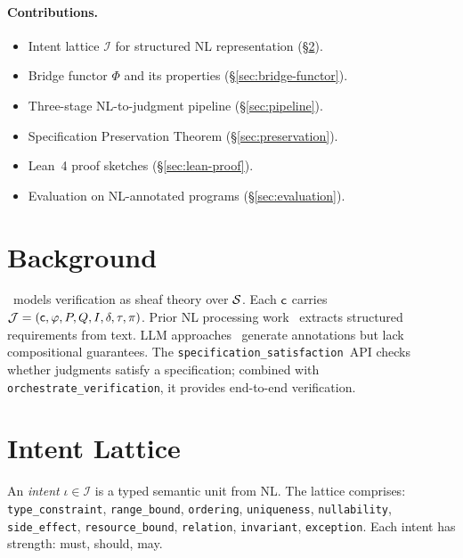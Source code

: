 \documentclass[11pt]{article}
\newcommand{\OrchestrateVerif}{\texttt{orchestrate\_verification}}
\newcommand{\SpecSatisfaction}{\texttt{specification\_satisfaction}}
\newcommand{\IntentLattice}{\mathcal{I}}
\newcommand{\SpecFunctor}{\Phi}
\begin{document}
\paragraph{Contributions.}
\begin{itemize}[noitemsep]
  \item Intent lattice $\IntentLattice$ for structured NL
        representation (§\ref{sec:intent-lattice}).
  \item Bridge functor $\SpecFunctor$ and its properties
        (§\ref{sec:bridge-functor}).
  \item Three-stage NL-to-judgment pipeline (§\ref{sec:pipeline}).
  \item Specification Preservation Theorem (§\ref{sec:preservation}).
  \item Lean~4 proof sketches (§\ref{sec:lean-proof}).
  \item Evaluation on \ppLXXprogramCount{} NL-annotated programs
        (§\ref{sec:evaluation}).
\end{itemize}

\section{Background}\label{sec:background}

\JuGeo\ models verification as sheaf theory over $\mathcal{S}$.  Each
$\mathsf{c}$ carries $\mathcal{J} = (\mathsf{c}, \varphi, P, Q, I, \delta, \tau, \pi)$.
Prior NL processing work~\cite{Harris2003,Ghosh2016} extracts
structured requirements from text.  LLM approaches~\cite{Chen2021}
generate annotations but lack compositional guarantees.  The
\SpecSatisfaction\ API checks whether judgments satisfy a specification;
combined with \OrchestrateVerif, it provides end-to-end verification.

\section{Intent Lattice}\label{sec:intent-lattice}

\begin{definition}[Intent]\label{def:intent}
An \emph{intent} $\iota \in \IntentLattice$ is a typed semantic unit
from NL.  The lattice comprises: \texttt{type\_constraint},
\texttt{range\_bound}, \texttt{ordering}, \texttt{uniqueness},
\texttt{nullability}, \texttt{side\_effect}, \texttt{resource\_bound},
\texttt{relation}, \texttt{invariant}, \texttt{exception}.
Each intent has strength: \textsf{must}, \textsf{should}, \textsf{may}.
\end{definition}
\end{document}
